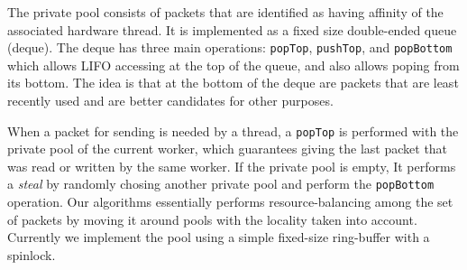 The private pool consists of packets that are identified as having affinity of
the associated hardware thread. It is implemented as a fixed size double-ended
queue (deque). The deque has three main operations: \texttt{popTop},
\texttt{pushTop}, and \texttt{popBottom} which allows LIFO accessing at the top
of the queue, and also allows poping from its bottom. The idea is that at the
bottom of the deque are packets that are least recently used and are better
candidates for other purposes. 

When a packet for sending is needed by a thread, a \texttt{popTop} is performed
with the private pool of the current worker, which guarantees giving the last
packet that was read or written by the same worker. If the private pool is
empty, It performs a \textit{steal} by randomly chosing another private pool and
perform the \texttt{popBottom} operation. Our algorithms essentially performs
resource-balancing among the set of packets by moving it around pools with the
locality taken into account. Currently we implement the pool using a simple
fixed-size ring-buffer with a spinlock.
